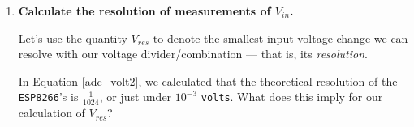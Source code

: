 \begin{enumerate}
	\item \textbf{Calculate the resolution of \adc measurements of $V_{in}$.}

	Let's use the quantity $V_{res}$ to denote the smallest input voltage change we can resolve with our voltage divider/\adc combination --- that is, its \emph{resolution}.
	
	\smallskip
	In Equation \ref{adc_volt2}, we calculated that the theoretical resolution of the \texttt{ESP8266}'s \adc is $\frac{1}{1024}$, or just under $10^{-3}$ \texttt{volts}. 
	What does this imply for our calculation of  $V_{res}$?
	

\end{enumerate}
